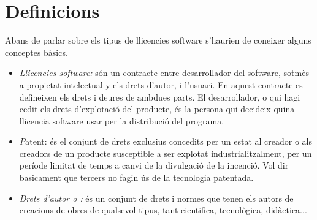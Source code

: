 \section{Definicions}
Abans de parlar sobre els tipus de llicencies software s'haurien de coneixer alguns conceptes bàsics.
\begin {itemize}
	\item \emph{Llicencies software:} són un contracte entre desarrollador del software, sotmès a 		propietat intelectual y els drets d'autor, i l'usuari. En aquest contracte es defineixen els drets i 		deures de ambdues parts. El desarrollador, o qui hagi cedit els drets d'explotació del producte, és la 		persona qui decideix quina llicencia software usar per la distribució del programa.
	\item \emph Patent: és el conjunt de drets exclusius concedits per un estat al creador o als creadors 		de un producte susceptible a ser explotat industrialitzalment, per un període limitat de temps a canvi 		de la divulgació de la incenció. Vol dir basicament que tercers no fagin ús de la tecnologia patentada.
	\item \emph{Drets d'autor o :} és un conjunt de drets i normes que tenen els 		autors de creacions de obres de qualsevol tipus, tant cientifica, tecnològica, didàctica...
\end {itemize}
